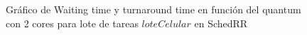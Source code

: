 \begin{figure}[H]
\hfill
{}
\hfill
{}
\hfill
\caption{Gráfico de Waiting time y turnaround time en función del quantum con 2 cores para lote de tareas $loteCelular$ en SchedRR}
\end{figure}


